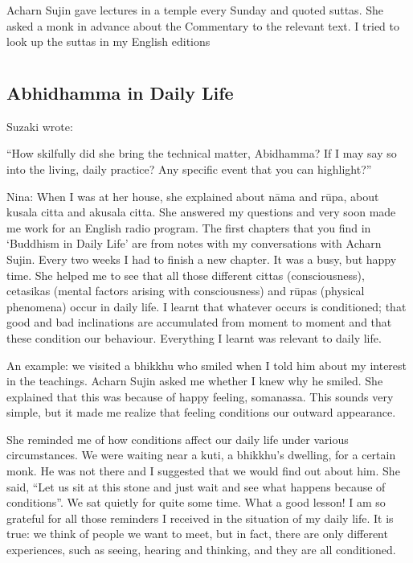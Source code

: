 Acharn Sujin gave lectures in a temple every Sunday and quoted suttas. She asked a monk in advance about the Commentary to the relevant text. I tried to look up the suttas in my English editions








\chapter[Abhidhamma in Daily Life]{}
\section*{Abhidhamma in Daily Life}


Suzaki wrote:

``How skilfully did she bring the technical matter, Abidhamma? If I may say
so into the living, daily practice? Any specific event that you can highlight?''

Nina: When I was at her house, she explained about nāma and rūpa, about kusala citta and akusala citta. She answered my questions and very soon made me work for an English radio program. The first chapters that you find in `Buddhism in Daily Life' are from notes with my conversations with Acharn Sujin. Every two weeks I had to finish a new chapter. It was a busy, but happy time. She helped me to see that all those different cittas (consciousness), cetasikas (mental factors arising with consciousness) and rūpas (physical phenomena) occur in daily life. I learnt that whatever occurs is conditioned; that good and bad inclinations are accumulated from moment to moment and that these condition our behaviour. Everything I learnt was relevant to daily life.

An example: we visited a bhikkhu who smiled when I told him about my interest in the teachings. Acharn Sujin asked me whether I knew why he smiled. She explained that this was because of happy feeling, somanassa. This sounds very simple, but it made me realize that feeling conditions our outward appearance.

She reminded me of how conditions affect our daily life under various circumstances. We were waiting near a kuti, a bhikkhu’s dwelling, for a certain monk. He was not there and I suggested that we would find out about him. She said, ``Let us sit at this stone and just wait and see what happens because of conditions''. We sat quietly for quite some time. What a good lesson! I am so grateful for all those reminders I received in the situation of my daily life. It is true: we think of people we want to meet, but in fact, there are only different experiences, such as seeing, hearing and thinking, and they are all conditioned.

